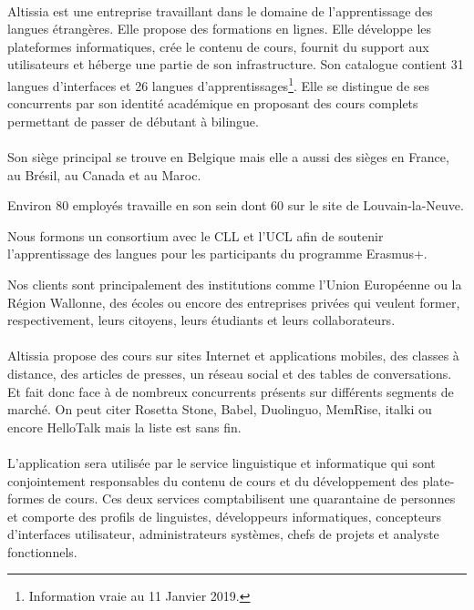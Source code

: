\paragraph{}
Altissia est une entreprise travaillant dans le domaine de l'apprentissage des langues étrangères.
Elle propose des formations en lignes.
Elle développe les plateformes informatiques, crée le contenu de cours, fournit du support aux utilisateurs et héberge une
partie de son infrastructure.
Son catalogue contient 31 langues d'interfaces et 26 langues d'apprentissages\footnote{Information vraie au 11 Janvier 2019.}. %
Elle se distingue de ses concurrents par son identité académique en proposant des cours complets permettant de passer de débutant à bilingue.

\paragraph{}
Son siège principal se trouve en Belgique mais elle a aussi des sièges en France, au Brésil, au Canada et au Maroc. %

Environ 80 employés travaille en son sein dont 60 sur le site de Louvain-la-Neuve. %

Nous formons un consortium avec le CLL et l'UCL afin de soutenir l'apprentissage des langues pour les participants du programme Erasmus+\cite{cll_actualites_nodate}{}.

Nos clients sont principalement des institutions comme l'Union Européenne ou la Région Wallonne, des écoles ou encore
des entreprises privées qui veulent former, respectivement, leurs citoyens, leurs étudiants et leurs collaborateurs.

\paragraph{}
Altissia propose des cours sur sites Internet et applications mobiles, des classes à distance, des articles de presses, un réseau social et des tables de conversations.
Et fait donc face à de nombreux concurrents présents sur différents segments de marché.
On peut citer Rosetta Stone, Babel, Duolinguo, MemRise, italki ou encore HelloTalk mais la liste est sans fin. %

\paragraph{}
L'application sera utilisée par le service linguistique et informatique qui sont conjointement responsables du contenu de cours
et du développement des plate-formes de cours.
Ces deux services comptabilisent une quarantaine de personnes et comporte des profils de linguistes, développeurs informatiques,
concepteurs d'interfaces utilisateur, administrateurs systèmes, chefs de projets et analyste fonctionnels.
